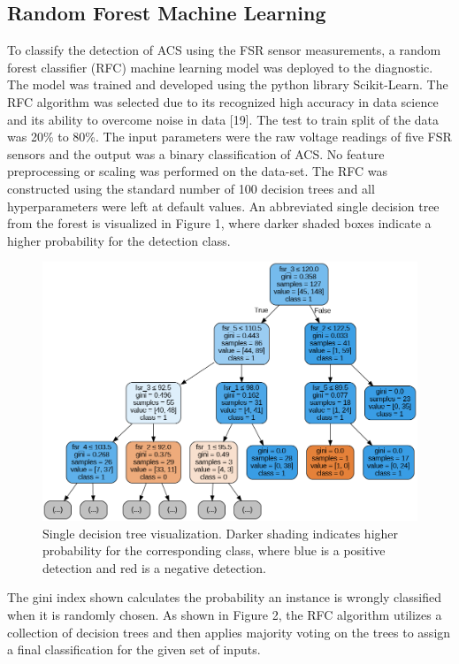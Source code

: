 \documentclass{article}
\begin{document}
\subsection{Random Forest Machine Learning}
To classify the detection of ACS using the FSR sensor measurements, a random forest classifier (RFC) machine learning model was deployed to the diagnostic. The model was trained and developed using the python library Scikit-Learn. The RFC algorithm was selected due to its recognized high accuracy in data science and its ability to overcome noise in data [19]. The test to train split of the data was 20\% to 80\%. The input parameters were the raw voltage readings of five FSR sensors and the output was a binary classification of ACS. No feature preprocessing or scaling was performed on the data-set. The RFC was constructed using the standard number of 100 decision trees and all hyperparameters were left at default values. An abbreviated single decision tree from the forest is visualized in Figure 1, where darker shaded boxes indicate a higher probability for the detection class. 

\begin{figure}[ht] %
    \centering
    \includegraphics[width=0.6\linewidth]{decision_tree.png}
    \caption{Single decision tree visualization. Darker shading indicates higher probability for the corresponding class, where blue is a positive detection and red is a negative detection.}
    \label{fig:fig1}
\end{figure}

The gini index shown calculates the probability an instance is wrongly classified when it is randomly chosen.
As shown in Figure 2, the RFC algorithm utilizes a collection of decision trees and then applies majority voting on the trees to assign a final classification for the given set of inputs.
\end{document}
